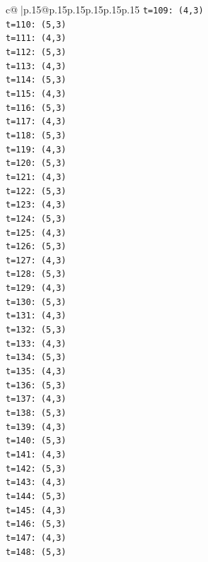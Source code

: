 \documentclass{article}
\begin{document}
{\begin{supertabular}{c@{$\;$}|p{.15\linewidth}@{}p{.15\linewidth}p{.15\linewidth}p{.15\linewidth}p{.15\linewidth}p{.15\linewidth}}
{{{\texttt{t=109: (4,3)} \\
\texttt{t=110: (5,3)} \\
\texttt{t=111: (4,3)} \\
\texttt{t=112: (5,3)} \\
\texttt{t=113: (4,3)} \\
\texttt{t=114: (5,3)} \\
\texttt{t=115: (4,3)} \\
\texttt{t=116: (5,3)} \\
\texttt{t=117: (4,3)} \\
\texttt{t=118: (5,3)} \\
\texttt{t=119: (4,3)} \\
\texttt{t=120: (5,3)} \\
\texttt{t=121: (4,3)} \\
\texttt{t=122: (5,3)} \\
\texttt{t=123: (4,3)} \\
\texttt{t=124: (5,3)} \\
\texttt{t=125: (4,3)} \\
\texttt{t=126: (5,3)} \\
\texttt{t=127: (4,3)} \\
\texttt{t=128: (5,3)} \\
\texttt{t=129: (4,3)} \\
\texttt{t=130: (5,3)} \\
\texttt{t=131: (4,3)} \\
\texttt{t=132: (5,3)} \\
\texttt{t=133: (4,3)} \\
\texttt{t=134: (5,3)} \\
\texttt{t=135: (4,3)} \\
\texttt{t=136: (5,3)} \\
\texttt{t=137: (4,3)} \\
\texttt{t=138: (5,3)} \\
\texttt{t=139: (4,3)} \\
\texttt{t=140: (5,3)} \\
\texttt{t=141: (4,3)} \\
\texttt{t=142: (5,3)} \\
\texttt{t=143: (4,3)} \\
\texttt{t=144: (5,3)} \\
\texttt{t=145: (4,3)} \\
\texttt{t=146: (5,3)} \\
\texttt{t=147: (4,3)} \\
\texttt{t=148: (5,3)} \\
}}}
\end{supertabular}}
\end{document}
